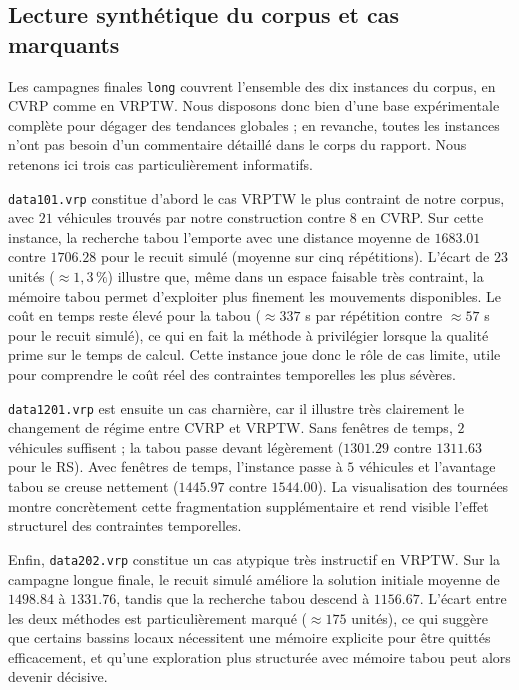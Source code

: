 \documentclass[11pt,a4paper]{article}
\begin{document}
\subsection{Lecture synthétique du corpus et cas marquants}
Les campagnes finales \texttt{long} couvrent l'ensemble des dix instances du corpus, en CVRP comme en VRPTW. Nous disposons donc bien d'une base expérimentale complète pour dégager des tendances globales ; en revanche, toutes les instances n'ont pas besoin d'un commentaire détaillé dans le corps du rapport. Nous retenons ici trois cas particulièrement informatifs.

\texttt{data101.vrp} constitue d'abord le cas VRPTW le plus contraint de notre corpus, avec \(21\) véhicules trouvés par notre construction contre \(8\) en CVRP. Sur cette instance, la recherche tabou l'emporte avec une distance moyenne de \(1683.01\) contre \(1706.28\) pour le recuit simulé (moyenne sur cinq répétitions). L'écart de \(23\) unités (\({\approx}1{,}3\,\%\)) illustre que, même dans un espace faisable très contraint, la mémoire tabou permet d'exploiter plus finement les mouvements disponibles. Le coût en temps reste élevé pour la tabou (\({\approx}337\) s par répétition contre \({\approx}57\) s pour le recuit simulé), ce qui en fait la méthode à privilégier lorsque la qualité prime sur le temps de calcul. Cette instance joue donc le rôle de cas limite, utile pour comprendre le coût réel des contraintes temporelles les plus sévères.

\texttt{data1201.vrp} est ensuite un cas charnière, car il illustre très clairement le changement de régime entre CVRP et VRPTW. Sans fenêtres de temps, \(2\) véhicules suffisent ; la tabou passe devant légèrement (\(1301.29\) contre \(1311.63\) pour le RS). Avec fenêtres de temps, l'instance passe à \(5\) véhicules et l'avantage tabou se creuse nettement (\(1445.97\) contre \(1544.00\)). La visualisation des tournées montre concrètement cette fragmentation supplémentaire et rend visible l'effet structurel des contraintes temporelles.

Enfin, \texttt{data202.vrp} constitue un cas atypique très instructif en VRPTW. Sur la campagne longue finale, le recuit simulé améliore la solution initiale moyenne de \(1498.84\) à \(1331.76\), tandis que la recherche tabou descend à \(1156.67\). L'écart entre les deux méthodes est particulièrement marqué (\({\approx}175\) unités), ce qui suggère que certains bassins locaux nécessitent une mémoire explicite pour être quittés efficacement, et qu'une exploration plus structurée avec mémoire tabou peut alors devenir décisive.
\end{document}
